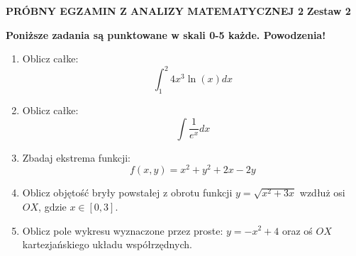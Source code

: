 \documentclass[12pt,a4paper]{article}
\begin{document}
	
	\begin{center}
		\LARGE
		\textbf{PRÓBNY EGZAMIN Z ANALIZY MATEMATYCZNEJ 2}
		\textbf{Zestaw 2}
	\end{center}
	\textbf{Poniższe zadania są punktowane w skali 0-5 każde. Powodzenia!}
	\begin{enumerate}
		\item Oblicz całke:
		$$\int_{1}^{2} 4x^3 \ln (x) dx$$
		
		\item Oblicz całke:
		$$\int \frac{1}{e^x} dx$$

		\item Zbadaj ekstrema funkcji:
		$$f(x,y)=x^2+y^2+2x-2y$$
		
		\item Oblicz objętość bryły powstałej z obrotu funkcji $y=\sqrt{x^2+3x}$ wzdłuż osi $OX$, gdzie $x\in [0,3]$.

		\item Oblicz pole wykresu wyznaczone przez proste: $y=-x^2+4$ oraz oś $OX$ kartezjańskiego układu współrzędnych.
	\end{enumerate}
\end{document}
